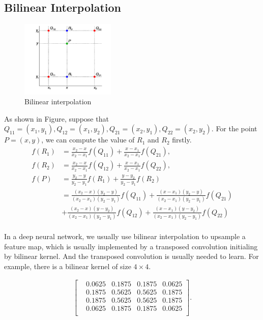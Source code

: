 \documentclass[10pt,onecolumn]{book}
\begin{document}
\subsection{Bilinear Interpolation}
\begin{figure}[h]
\centering
\includegraphics[width=0.4\textwidth]{figures/bilinear.png}
\caption{Bilinear interpolation}
\end{figure}
As shown in Figure, suppose that $Q_{11} = (x_1, y_1), Q_{12} = (x_1, y_2), Q_{21} = (x_2, y_1), Q_{22} = (x_2, y_2)$.
For the point $P = (x, y)$, we can compute the value of $R_{1}$ and $R_2$ firstly.
\begin{equation}
\begin{split}
f(R_1) &= \frac{x_2 - x}{x_2 - x_1} f(Q_{11}) + \frac{x - x_1}{x_2 - x_1} f(Q_{21}), \\
f(R_2) &= \frac{x_2 - x}{x_2 - x_1} f(Q_{12}) + \frac{x - x_1}{x_2 - x_1} f(Q_{22}), \\
f(P) &= \frac{y_2 - y}{y_2 - y_1} f(R_1) + \frac{y - y_2}{y_2 - y_1}f(R_2) \\
	 &= \frac{(x_2 - x)(y_2 - y)}{(x_2 - x_1)(y_2 - y_1)} f(Q_{11}) + \frac{(x - x_1)(y_2 - y)}{(x_2 - x_1)(y_2 - y_1)} f(Q_{21}) \\
	 & + \frac{(x_2 - x)(y - y_2)}{(x_2 - x_1)(y_2 - y_1)} f(Q_{12}) + \frac{(x - x_1)(y - y_2)}{(x_2 - x_1)(y_2 - y_1)} f(Q_{22}) \\   
\end{split}
\end{equation}

In a deep neural network, we usually use bilinear interpolation to upsample a feature map, which is usually implemented by a transposed convolution initialing by bilinear kernel. And the transposed convolution is usually needed to learn. For example, there is a bilinear kernel of size $4 \times 4$.

\begin{equation}
\begin{split}
\left[
\begin{matrix}
	& 0.0625 & 0.1875 & 0.1875 & 0.0625 \\
    & 0.1875 & 0.5625 & 0.5625 & 0.1875 \\
    & 0.1875 & 0.5625 & 0.5625 & 0.1875 \\
    & 0.0625 & 0.1875 & 0.1875 & 0.0625 \\
\end{matrix}
\right].
\end{split}
\end{equation}
\end{document}
